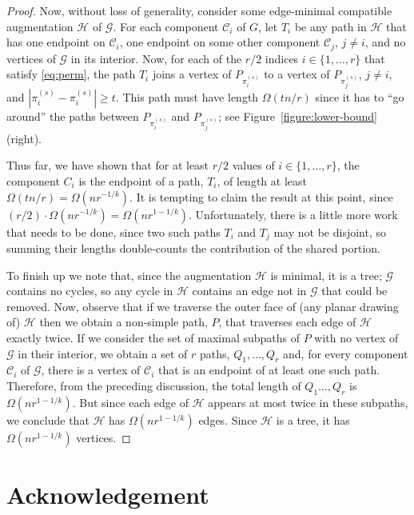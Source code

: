 \documentclass{patmorin}
\begin{document}
\begin{proof}
Now, without loss of generality, consider some edge-minimal compatible
augmentation $\mathcal H$ of $\mathcal G$.  For each component
$\mathcal{C}_i$ of $G$, let $T_i$ be any path in $\mathcal H$ that has
one endpoint on $\mathcal C_i$, one endpoint on some other component
$\mathcal{C}_j$, $j\neq i$, and no vertices of $\mathcal G$ in its
interior.
Now, for each of the $r/2$ indices $i\in\{1,\ldots,r\}$ that satisfy
\eqref{eq:perm}, the path $T_i$ joins a vertex of
$P_{\pi^{(s)}_i}$ to a vertex of $P_{\pi^{(s)}_j}$, $j\neq
i$, and $|\pi^{(s)}_i-\pi^{(s)}_i|\ge t$.  This path must
have length $\Omega(tn/r)$ since it has to ``go around'' the
paths between $P_{\pi^{(s)}_i}$ and $P_{\pi^{(s)}_j}$; see
Figure~\ref{figure:lower-bound} (right).

Thus far, we have shown that for at least $r/2$ values of
$i\in\{1,\ldots,r\}$, the component $C_i$ is the endpoint of a
path, $T_i$, of length at least $\Omega(tn/r)=\Omega(nr^{-1/k})$.
It is tempting to claim the result at this point, since
$(r/2)\cdot\Omega(nr^{-1/k})=\Omega(nr^{1-1/k})$. Unfortunately, there
is a little more work that needs to be done, since two such paths $T_i$
and $T_j$ may not be disjoint, so summing their lengths double-counts
the contribution of the shared portion.

To finish up we note that, since the augmentation $\mathcal{H}$ is minimal,
it is a tree; $\mathcal G$ contains no cycles, so any cycle in $\mathcal H$ contains an edge not in $\mathcal G$ that could be removed.  Now, observe that if we traverse the outer face of (any planar drawing of) $\mathcal H$ then we obtain a non-simple path, $P$, that traverses each edge of $\mathcal{H}$ exactly twice. If we consider the set of maximal subpaths of $P$ with no vertex of $\mathcal G$ in their interior, we obtain a set of $r$ paths, $Q_1,\ldots,Q_{r}$ and, for every component $\mathcal C_i$ of $\mathcal G$, there is a vertex of $\mathcal C_i$ that is an endpoint of at least one such path.  Therefore, from the preceding discussion, the total length of $Q_1\ldots,Q_{r}$ is $\Omega(nr^{1-1/k})$.  But since each edge of $\mathcal H$ appears at most twice in these subpaths, we conclude that $\mathcal H$ has $\Omega(nr^{1-1/k})$ edges.  Since $\mathcal H$ is a tree, it has $\Omega(nr^{1-1/k})$ vertices.
\end{proof}


\section*{Acknowledgement}
\end{document}
